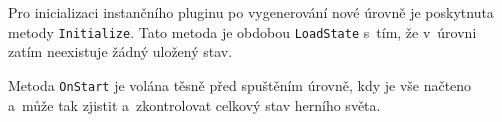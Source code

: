 Pro inicializaci instančního pluginu po vygenerování nové úrovně je poskytnuta metody \texttt{Initialize}. Tato metoda je obdobou \texttt{LoadState} s~tím, že v~úrovni zatím neexistuje žádný uložený stav.

Metoda \texttt{OnStart} je volána těsně před spuštěním úrovně, kdy je vše načteno a~může tak zjistit a~zkontrolovat celkový stav herního světa.



